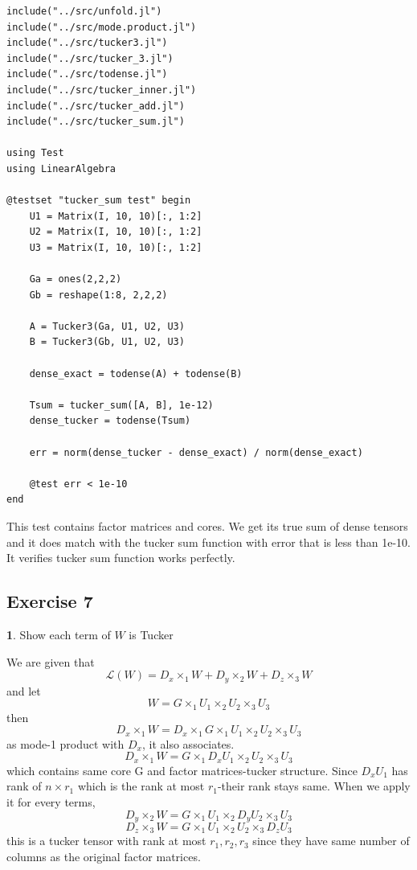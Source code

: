 \documentclass[11pt]{article}
\begin{document}
\begin{lstlisting}
include("../src/unfold.jl")
include("../src/mode.product.jl")
include("../src/tucker3.jl")
include("../src/tucker_3.jl")
include("../src/todense.jl")
include("../src/tucker_inner.jl")
include("../src/tucker_add.jl")
include("../src/tucker_sum.jl")

using Test
using LinearAlgebra

@testset "tucker_sum test" begin
    U1 = Matrix(I, 10, 10)[:, 1:2]
    U2 = Matrix(I, 10, 10)[:, 1:2]
    U3 = Matrix(I, 10, 10)[:, 1:2]

    Ga = ones(2,2,2)           
    Gb = reshape(1:8, 2,2,2)      

    A = Tucker3(Ga, U1, U2, U3)
    B = Tucker3(Gb, U1, U2, U3)

    dense_exact = todense(A) + todense(B)

    Tsum = tucker_sum([A, B], 1e-12)
    dense_tucker = todense(Tsum)

    err = norm(dense_tucker - dense_exact) / norm(dense_exact)

    @test err < 1e-10
end
\end{lstlisting}

This test contains factor matrices and cores. We get its true sum of dense tensors and it does match with the tucker sum function with error that is less than 1e-10.
It verifies tucker sum function works perfectly.

\subsection*{Exercise 7}

\textbf{1}. Show each term of $W$ is Tucker

\vspace{1em}

We are given that
\[
\mathcal{L}(W) = D_x \times_1 W + D_y \times_2 W + D_z \times_3 W
\]
and let
\[
W = G \times_1 U_1 \times_2 U_2 \times_3 U_3
\]
then
\[
D_x \times_1 W = D_x \times_1 G \times_1 U_1 \times_2 U_2 \times_3 U_3
\]
as mode-1 product with $D_x$, it also associates.
\[
D_x \times_1 W = G \times_1  D_x U_1 \times_2 U_2 \times_3 U_3
\]
which contains same core G and factor matrices-tucker structure. Since $D_x U_1$ has rank of $n\times r_1$ which is the rank at most $r_1$-their rank stays same.
When we apply it for every terms,
\[
D_y \times_2 W = G \times_1  U_1 \times_2 D_y U_2 \times_3 U_3
\]
\[
D_z \times_3 W = G \times_1  U_1 \times_2 U_2 \times_3 D_z U_3
\]
this is a tucker tensor with rank at most $r_1, r_2, r_3$ since they have same number of columns as the original factor matrices.
\end{document}

